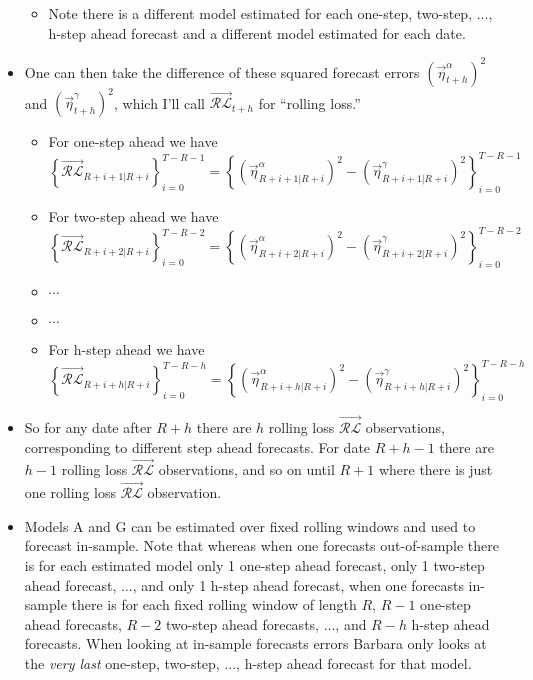 \documentclass[11pt]{article}
\begin{document}
\begin{itemize}
\begin{itemize}
\item Note there is a different model estimated for each one-step, two-step, ..., h-step ahead forecast and a different model estimated for each date.  
\end{itemize}
\item One can then take the difference of these squared forecast errors $\left(\overrightarrow{\eta}^{\alpha}_{t+h}\right)^{2}$ and
 $\left(\overrightarrow{\eta}^{\gamma}_{t+h}\right)^{2}$, which I'll call $\overrightarrow{\mathcal{RL}}_{t+h}$ for ``rolling loss.''
\begin{itemize}
\item For one-step ahead we have $\left\{\overrightarrow{\mathcal{RL}}_{R+i+1|R+i}\right\}_{i=0}^{T-R-1}\!\!\!\!=\left\{\left(\overrightarrow{\eta}^{\alpha}_{R+i+1|R+i}\right)^{2}\!\!-\left(\overrightarrow{\eta}^{\gamma}_{R+i+1|R+i}\right)^{2}\right\}_{i=0}^{T-R-1}$
\item For two-step ahead we have $\left\{\overrightarrow{\mathcal{RL}}_{R+i+2|R+i}\right\}_{i=0}^{T-R-2}\!\!\!\!=\left\{\left(\overrightarrow{\eta}^{\alpha}_{R+i+2|R+i}\right)^{2}\!\!-\left(\overrightarrow{\eta}^{\gamma}_{R+i+2|R+i}\right)^{2}\right\}_{i=0}^{T-R-2}$
\item $\cdots$
\item $\cdots$
\item For h-step ahead we have $\left\{\overrightarrow{\mathcal{RL}}_{R+i+h|R+i}\right\}_{i=0}^{T-R-h}\!\!\!\!=\left\{\left(\overrightarrow{\eta}^{\alpha}_{R+i+h|R+i}\right)^{2}\!\!-\left(\overrightarrow{\eta}^{\gamma}_{R+i+h|R+i}\right)^{2}\right\}_{i=0}^{T-R-h}$
\end{itemize}
\item So for any date after $R+h$ there are $h$ rolling loss $\overrightarrow{\mathcal{RL}}$ observations, corresponding to different step ahead forecasts.  For date $R+h-1$ there are $h-1$ rolling loss $\overrightarrow{\mathcal{RL}}$ observations, and so on until $R+1$ where there is just one rolling loss $\overrightarrow{\mathcal{RL}}$ observation.
\item Models A and G can be estimated over fixed rolling windows and used to forecast in-sample.  Note that whereas when one forecasts out-of-sample there is for each estimated model only 1 one-step ahead forecast, only 1 two-step ahead forecast, ..., and only 1 h-step ahead forecast, when one forecasts in-sample there is for each fixed rolling window of length $R$, $R-1$ one-step ahead forecasts, $R-2$ two-step ahead forecasts, ..., and $R-h$ h-step ahead forecasts.  When looking at in-sample forecasts errors Barbara only looks at the \emph{very last} one-step, two-step, ..., h-step ahead forecast for that model.  

\end{itemize}
\end{document}
